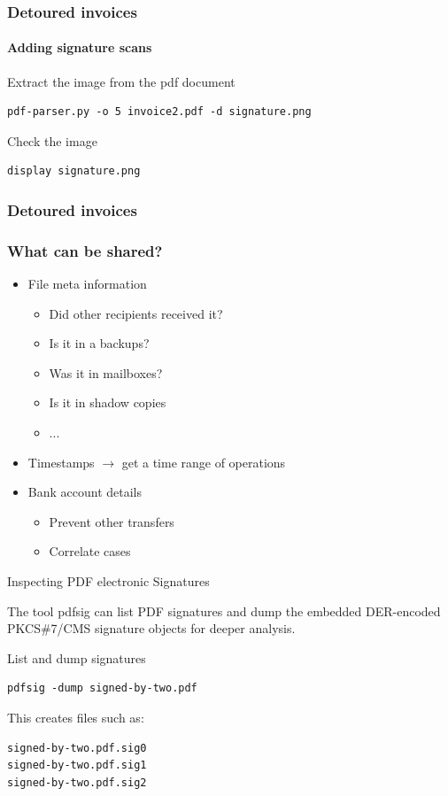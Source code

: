 \begin{frame}[fragile]
    \frametitle{Detoured invoices}
    \framesubtitle{Adding signature scans}

Extract the image from the pdf document

\begin{lstlisting}
pdf-parser.py -o 5 invoice2.pdf -d signature.png
\end{lstlisting}

Check the image

\begin{lstlisting}
display signature.png
\end{lstlisting}


\end{frame}

\begin{frame}
    \frametitle{Detoured invoices}
    \frametitle{What can be shared?}
    \begin{itemize}
        \item  File meta information
            \begin{itemize}
                \item Did other recipients received it?
                \item Is it in a backups?
                \item Was it in mailboxes?
                \item Is it in shadow copies
                \item ...
            \end{itemize}
        \item Timestamps $\to$ get a time range of operations
        \item Bank account details
        \begin{itemize}
            \item Prevent other transfers
            \item Correlate cases
        \end{itemize}
    \end{itemize}
\end{frame}

\begin{frame}[fragile]{Inspecting PDF electronic Signatures}

The tool \alert{pdfsig} can list PDF signatures and dump the embedded DER-encoded
PKCS\#7/CMS signature objects for deeper analysis.

\medskip

\begin{block}{List and dump signatures}
\begin{verbatim}
pdfsig -dump signed-by-two.pdf
\end{verbatim}
\end{block}

This creates files such as:

\begin{verbatim}
signed-by-two.pdf.sig0
signed-by-two.pdf.sig1
signed-by-two.pdf.sig2
\end{verbatim}


\end{frame}

